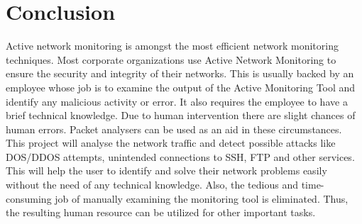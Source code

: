 \chapter{Conclusion}
{
	Active network monitoring is amongst the most efficient network monitoring techniques. Most corporate organizations use Active Network Monitoring to ensure the security and integrity of their networks. This is usually backed by an employee whose job is to examine the output of the Active Monitoring Tool and identify any malicious activity or error. It also requires the employee to have a brief technical knowledge. Due to human intervention there are slight chances of human errors. Packet analysers can be used as an aid in these circumstances. \\ 
	This project will analyse the network traffic and detect possible attacks like DOS/DDOS attempts, unintended connections to SSH, FTP and other services. This will help the user to identify and solve their network problems easily without the need of any technical knowledge. Also, the tedious and time-consuming job of manually examining the monitoring tool is eliminated. Thus, the resulting human resource can be utilized for other important tasks.
}